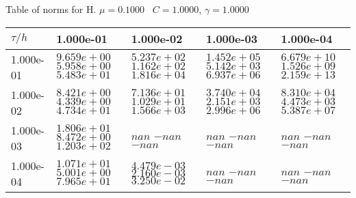 \begin{center}
Table of norms for H. $\mu = 0.1000$ \, $C = 1.0000$, $\gamma = 1.0000$
  
\begin{tabular}{|p{1in}|p{1in}|p{1in}|p{1in}|p{1in}|} \hline
$\tau / h$ &1.000e-01 &1.000e-02 &1.000e-03 &1.000e-04 \\ \hline 
1.000e-01 & $9.659e+00$  $5.958e+00$  $5.483e+01$  & $5.237e+02$  $1.162e+02$  $1.816e+04$  & $1.452e+05$  $5.142e+03$  $6.937e+06$  & $6.679e+10$  $1.526e+09$  $2.159e+13$  \\ \hline 
1.000e-02 & $8.421e+00$  $4.339e+00$  $4.734e+01$  & $7.136e+01$  $1.029e+01$  $1.566e+03$  & $3.740e+04$  $2.151e+03$  $2.996e+06$  & $8.310e+04$  $4.473e+03$  $5.387e+07$  \\ \hline 
1.000e-03 & $1.806e+01$  $8.472e+00$  $1.203e+02$  & $nan$  $-nan$  $-nan$  & $nan$  $-nan$  $-nan$  & $nan$  $-nan$  $-nan$  \\ \hline 
1.000e-04 & $1.071e+01$  $5.001e+00$  $7.965e+01$  & $4.479e-03$  $2.160e-03$  $3.250e-02$  & $nan$  $-nan$  $-nan$  & $nan$  $-nan$  $-nan$  \\ \hline 

\end{tabular}\\[20pt]
\end{center}
